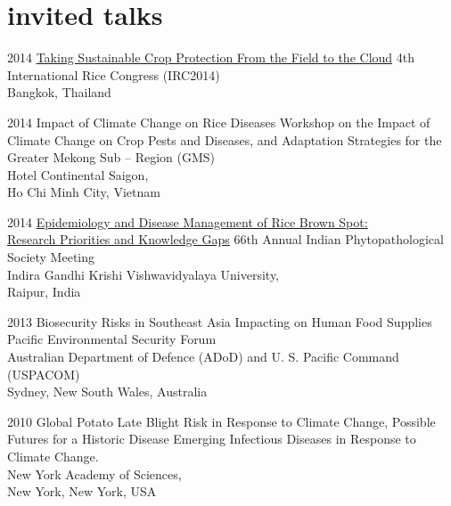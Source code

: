 \documentclass[]{friggeri-cv}
\begin{document}
\section*{invited talks}
\begin{entrylist}
 \entry
	{2014}
	{\href{http://figshare.com/articles/Taking_Sustainable_Crop_Protection_From_the_Field_to_the_Cloud/1225800}{Taking Sustainable Crop Protection From the Field to the Cloud}}
	{}
	{4th International Rice Congress (IRC2014)\\Bangkok, Thailand}
	
\entry
	{2014}
	{Impact of Climate Change on Rice Diseases}
	{}
	{Workshop on the Impact of Climate Change on Crop Pests and Diseases, and Adaptation Strategies for the Greater Mekong Sub -- Region (GMS)\\Hotel Continental Saigon,\\Ho Chi Minh City, Vietnam}
	
\entry
	{2014}
	{\href{http://figshare.com/articles/IPS_2014/1037569}{Epidemiology and Disease Management of Rice Brown Spot:\\Research Priorities and Knowledge Gaps}}
	{}
	{66th Annual Indian Phytopathological Society Meeting\\Indira Gandhi Krishi Vishwavidyalaya University,\\Raipur, India}
	
\entry
	{2013}
	{Biosecurity Risks in Southeast Asia Impacting on Human Food Supplies}
	{}
	{Pacific Environmental Security Forum\\Australian Department of Defence (ADoD) and U. S. Pacific Command (USPACOM)\\Sydney, New South Wales, Australia}

\entry
	{2010} 
	{Global Potato Late Blight Risk in Response to Climate Change, Possible Futures for a Historic Disease}
  	{}
  	{Emerging Infectious Diseases in Response to Climate Change.\\New York Academy of Sciences,\\New York, New York, USA}
\end{entrylist}
\end{document}
